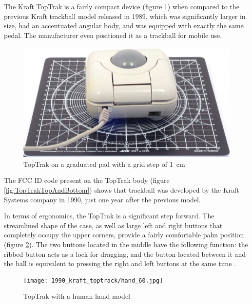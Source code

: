 \documentclass[11pt, a4paper]{article}
\begin{document}
The Kraft TopTrak is a fairly compact device (figure \ref{fig:TopTrakSize}) when compared to the previous Kraft trackball model released in 1989, which was significantly larger in size, had an accentuated angular body, and was equipped with exactly the same pedal. The manufacturer even positioned it as a trackball for mobile use.

\begin{figure}[h]
    \centering
    \includegraphics[scale=0.40]{1990_kraft_toptrack/2.6_30.jpg}
    \caption{TopTrak on a graduated pad with a grid step of 1~cm}
    \label{fig:TopTrakSize}
\end{figure}


The FCC ID code present on the TopTrak body (figure \ref{fig:TopTrakTopAndBottom}) shows that trackball was developed by the Kraft Systems company in 1990, just one year after the previous model.

In terms of ergonomics, the TopTrak is a significant step forward. The streamlined shape of the case, as well as large left and right buttons that completely occupy the upper corners, provide a fairly comfortable palm position (figure \ref{fig:TopTrakHand}). The two buttons located in the middle have the following function: the ribbed button acts as a lock for dragging, and the button located between it and the ball is equivalent to pressing the right and left buttons at the same time \cite{mouses}.


\begin{figure}[h]
    \centering
    \texttt{[image: 1990\_kraft\_toptrack/hand\_60.jpg]}
    \caption{TopTrak with a human hand model}
    \label{fig:TopTrakHand}
\end{figure}


\end{document}
